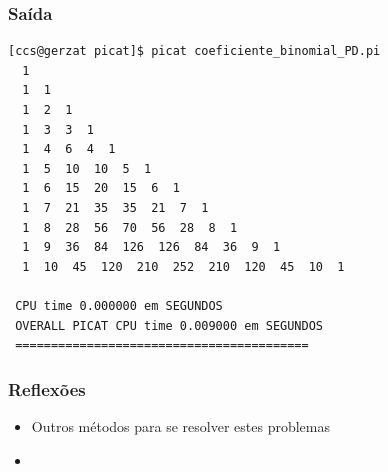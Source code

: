 \begin{frame}[fragile]

\frametitle{Saída}

\begin{small}
\begin{verbatim}
[ccs@gerzat picat]$ picat coeficiente_binomial_PD.pi 
  1 
  1  1 
  1  2  1 
  1  3  3  1 
  1  4  6  4  1 
  1  5  10  10  5  1 
  1  6  15  20  15  6  1 
  1  7  21  35  35  21  7  1 
  1  8  28  56  70  56  28  8  1 
  1  9  36  84  126  126  84  36  9  1 
  1  10  45  120  210  252  210  120  45  10  1 

 CPU time 0.000000 em SEGUNDOS 
 OVERALL PICAT CPU time 0.009000 em SEGUNDOS  
 =========================================
\end{verbatim}
    
\end{small}
\end{frame}




\begin{frame}[fragile]
\frametitle{Reflexões}


\begin{itemize}
  \item Outros métodos para se resolver estes problemas
  \pause
  \item 
  \pause
\end{itemize}

\end{frame}
